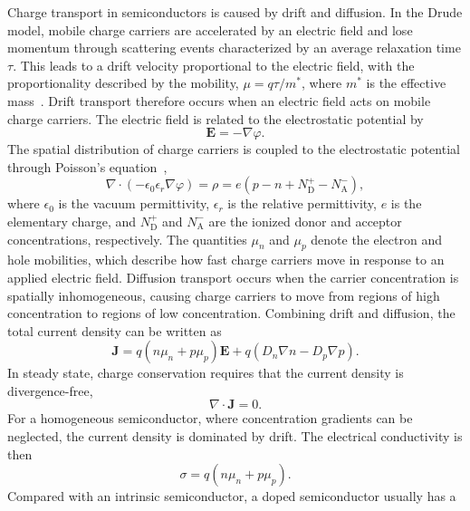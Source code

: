 Charge transport in semiconductors is caused by drift and diffusion. In the
Drude model, mobile charge carriers are accelerated by an electric field and
lose momentum through scattering events characterized by an average relaxation
time $\tau$. This leads to a drift velocity proportional to the electric field,
with the proportionality described by the mobility, $\mu = q\tau/m^*$, where
$m^*$ is the effective mass~\cite{Neamen}. Drift transport therefore occurs
when an electric field acts on mobile charge carriers. The electric field is
related to the electrostatic potential by
\begin{equation}
    \mathbf{E} = - \nabla \varphi .
\end{equation}
The spatial distribution of charge carriers is coupled to the electrostatic
potential through Poisson's equation~\cite{Neamen},
\begin{equation}
    \nabla \cdot \left(-\epsilon_0 \epsilon_r \nabla \varphi\right)
    = \rho
    = e \left(p - n + N_\mathrm{D}^{+} - N_\mathrm{A}^{-}\right),
\end{equation}
where $\epsilon_0$ is the vacuum permittivity, $\epsilon_r$ is the relative
permittivity, $e$ is the elementary charge, and $N_\mathrm{D}^{+}$ and
$N_\mathrm{A}^{-}$ are the ionized donor and acceptor concentrations,
respectively.
The quantities $\mu_n$ and $\mu_p$ denote the electron and hole mobilities,
which describe how fast charge carriers move in response to an applied electric
field. Diffusion transport occurs when the carrier concentration is spatially
inhomogeneous, causing charge carriers to move from regions of high
concentration to regions of low concentration. Combining drift and diffusion,
the total current density can be written as~\cite{Neamen}
\begin{equation}
    \mathbf{J} = q \left(n\mu_n + p\mu_p\right)\mathbf{E}
    + q \left(D_n\nabla n - D_p\nabla p\right).
\end{equation}
In steady state, charge conservation requires that the current density is
divergence-free,
\begin{equation}
    \nabla \cdot \mathbf{J} = 0.
\end{equation}
For a homogeneous semiconductor, where concentration gradients can be neglected,
the current density is dominated by drift. The electrical conductivity is then
\begin{equation}
    \sigma = q \left(n\mu_n + p\mu_p\right).
\end{equation}
Compared with an intrinsic semiconductor, a doped semiconductor usually has a
